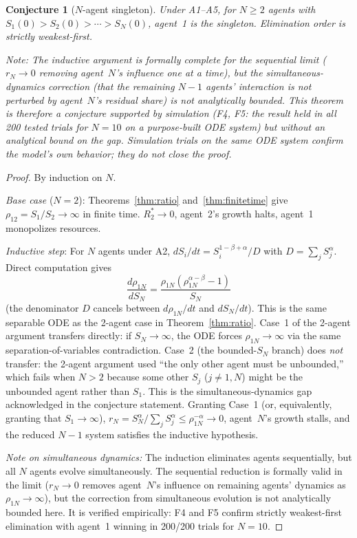 \documentclass[11pt,letterpaper]{article}
\theoremstyle{plain}
\newtheorem{conjecture}[theorem]{Conjecture}
\theoremstyle{definition}
\theoremstyle{remark}
\begin{document}
\begin{conjecture}[$N$-agent singleton]
\label{thm:nagent}
Under A1--A5, for $N \geq 2$ agents with
$S_1(0) > S_2(0) > \cdots > S_N(0)$, agent~1 is the singleton.
Elimination order is strictly weakest-first.

\emph{Note:} The inductive argument is formally complete for the sequential
limit ($r_N \to 0$ removing agent~$N$'s influence one at a time), but the
simultaneous-dynamics correction (that the remaining $N-1$ agents'
interaction is not perturbed by agent~$N$'s residual share) is not
analytically bounded.
This theorem is therefore a conjecture supported by simulation (F4, F5:
the result held in all 200 tested trials for $N=10$ on a purpose-built ODE
system) but without an analytical bound on the gap.
Simulation trials on the same ODE system confirm the model's own behavior;
they do not close the proof.
\end{conjecture}

\begin{proof}
By induction on $N$.

\textit{Base case} ($N = 2$): Theorems~\ref{thm:ratio} and~\ref{thm:finitetime}
give $\rho_{12} = S_1/S_2 \to \infty$ in finite time.
$R_2^* \to 0$, agent~2's growth halts, agent~1 monopolizes resources. \checkmark

\textit{Inductive step}: For $N$ agents under A2,
$dS_i/dt = S_i^{1-\beta+\alpha}/D$ with $D = \sum_j S_j^\alpha$.
Direct computation gives
\[
  \frac{d\rho_{1N}}{dS_N}
  = \frac{\rho_{1N}(\rho_{1N}^{\alpha-\beta} - 1)}{S_N}
\]
(the denominator $D$ cancels between $d\rho_{1N}/dt$ and $dS_N/dt$).
This is the same separable ODE as the 2-agent case in
Theorem~\ref{thm:ratio}.
Case~1 of the 2-agent argument transfers directly: if $S_N \to \infty$,
the ODE forces $\rho_{1N} \to \infty$ via the same separation-of-variables
contradiction.
Case~2 (the bounded-$S_N$ branch) does \emph{not} transfer: the 2-agent
argument used ``the only other agent must be unbounded,'' which fails
when $N > 2$ because some other $S_j$ ($j \neq 1, N$) might be the
unbounded agent rather than $S_1$.
This is the simultaneous-dynamics gap acknowledged in the conjecture
statement.
Granting Case~1 (or, equivalently, granting that $S_1 \to \infty$),
$r_N = S_N^\alpha / \sum_j S_j^\alpha \leq \rho_{1N}^{-\alpha} \to 0$,
agent~$N$'s growth stalls, and the reduced $N{-}1$ system satisfies
the inductive hypothesis.

\textit{Note on simultaneous dynamics:}
The induction eliminates agents sequentially, but all $N$ agents evolve
simultaneously.
The sequential reduction is formally valid in the limit ($r_N \to 0$ removes
agent~$N$'s influence on remaining agents' dynamics as $\rho_{1N}\to\infty$),
but the correction from simultaneous evolution is not analytically bounded here.
It is verified empirically: F4 and F5 confirm strictly weakest-first
elimination with agent~1 winning in 200/200 trials for $N = 10$.
\end{proof}
\end{document}
